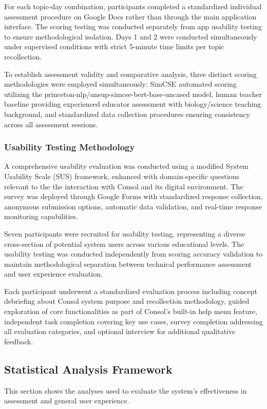{For each topic-day combination, participants completed a standardized individual assessment procedure on Google Docs rather than through the main application interface. The scoring testing was conducted separately from app usability testing to ensure methodological isolation. Days 1 and 2 were conducted simultaneously under supervised conditions with strict 5-minute time limits per topic recollection.


To establish assessment validity and comparative analysis, three distinct scoring methodologies were employed simultaneously: SimCSE automated scoring utilizing the princeton-nlp/unsup-simcse-bert-base-uncased model, human teacher baseline providing experienced educator assessment with biology/science teaching background, and standardized data collection procedures ensuring consistency across all assessment sessions.

\subsubsection{Usability Testing Methodology}

A comprehensive usability evaluation was conducted using a modified System Usability Scale (SUS) framework, enhanced with domain-specific questions relevant to the the interaction with Consol and its digital environment. The survey was deployed through Google Forms with standardized response collection, anonymous submission options, automatic data validation, and real-time response monitoring capabilities.

Seven participants were recruited for usability testing, representing a diverse cross-section of potential system users across various educational levels. The usability testing was conducted independently from scoring accuracy validation to maintain methodological separation between technical performance assessment and user experience evaluation.

Each participant underwent a standardized evaluation process including concept debriefing about Consol system purpose and recollection methodology, guided exploration of core functionalities as part of Consol's built-in help menu feature, independent task completion covering key use cases, survey completion addressing all evaluation categories, and optional interview for additional qualitative feedback.

\subsection{Statistical Analysis Framework}
This section shows the analyses used to evaluate the system's effectiveness in assessment and general user experience.  


}
